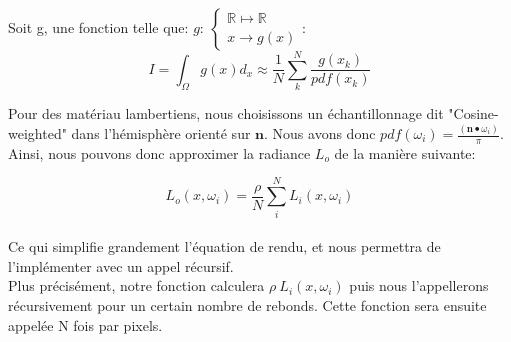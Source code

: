 \documentclass{article}
\begin{document}
	 Soit g, une fonction telle que: $g:\ \left\{
	 \begin{array}{l}
	 \mathbb{R} \longmapsto \mathbb{R}\\
	 x\longrightarrow g(x)
	 \end{array}
	 \right.$:
	 $$
	 I = \int_\Omega g(x)d_x \approx \frac1{N}\sum_k^N\frac{g(x_k)}{pdf(x_k)}
	 $$
	 
	 Pour des matériau lambertiens, nous choisissons un échantillonnage dit "Cosine-weighted" dans l'hémisphère orienté sur $\textbf{n}$. Nous avons donc $pdf(\omega_i)=\frac{(\textbf{n}\bullet\omega_i)}{\pi}$.\\
	 
	 Ainsi, nous pouvons donc approximer la radiance $L_o$ de la manière suivante:
	 
	 $$ 
	 \boxed{L_o\left(x, \omega_i\right) = \frac\rho N\sum_i^N L_i\left(x, \omega_i\right)}
	 $$\\
	 
	 Ce qui simplifie grandement l'équation de rendu, et nous permettra de l'implémenter avec un appel récursif.\\
	 Plus précisément, notre fonction calculera $\rho\ L_i\left(x, \omega_i\right)$ puis nous l'appellerons récursivement pour un certain nombre de rebonds. Cette fonction sera ensuite appelée N fois par pixels.
\end{document}
